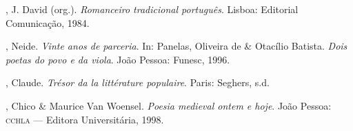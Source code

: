 \begin{bibliohedra}[]
, J. David (org.). \textit{Romanceiro tradicional português}. Lisboa: Editorial Comunicação, 1984.

, Neide. \textit{Vinte anos de parceria}. In: Panelas, Oliveira de \& Otacílio Batista. \textit{Dois poetas do
povo e da viola}. João Pessoa: Funesc, 1996.

, Claude. \textit{Trésor da la littérature populaire}. Paris: Seghers, s.d.

, Chico \& Maurice Van Woensel. \textit{Poesia medieval ontem e hoje}. João Pessoa: \textsc{cchla} --- Editora Universitária,
1998.

\end{bibliohedra}
